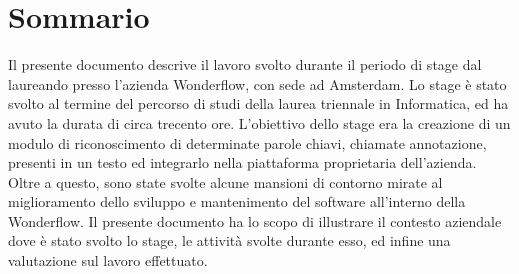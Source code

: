 \cleardoublepage
{}
\chapter*{Sommario}
\thispagestyle{empty}
Il presente documento descrive il lavoro svolto durante il periodo di stage dal
laureando \myName presso l’azienda Wonderflow, con sede ad Amsterdam.
Lo stage è stato svolto al termine del percorso di studi della laurea triennale
in Informatica, ed ha avuto la durata di circa trecento ore.
L’obiettivo dello stage era la creazione di un modulo di riconoscimento di
determinate parole chiavi, chiamate \gls{annotazione}, presenti in un
testo ed integrarlo nella piattaforma proprietaria dell'azienda. Oltre a
questo, sono state svolte alcune mansioni di contorno mirate al miglioramento
dello sviluppo e mantenimento del software all'interno della Wonderflow.
Il presente documento ha lo scopo di illustrare il contesto aziendale dove è
stato svolto lo stage, le attività svolte durante esso, ed infine una
valutazione sul lavoro effettuato.
\bigskip
